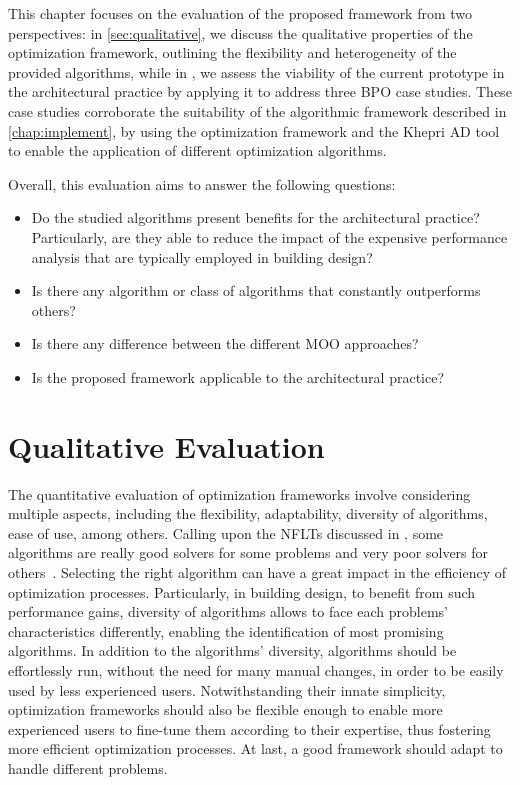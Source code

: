 \label{chap:evaluation}
 
This chapter focuses on the evaluation of the proposed framework from two perspectives: in \cref{sec:qualitative}, we discuss the qualitative properties of the optimization framework, outlining the flexibility and heterogeneity of the provided algorithms, while in , we assess the viability of the current prototype in the architectural practice by applying it to address three \ac{BPO} case studies. These case studies corroborate the suitability of the algorithmic framework described in \cref{chap:implement}, by using the optimization framework and the Khepri \ac{AD} tool to enable the application of different optimization algorithms. 

Overall, this evaluation aims to answer the following questions: 
\begin{itemize}
	\item Do the studied algorithms present benefits for the architectural practice? Particularly, are they able to reduce the impact of the expensive performance analysis that are typically employed in building design?
	\item Is there any algorithm or class of algorithms that constantly outperforms others?
	\item Is there any difference between the different \ac{MOO} approaches? 
	\item Is the proposed framework applicable to the architectural practice? 
\end{itemize}

\section{Qualitative Evaluation}
\label{sec:qualitative}
The quantitative evaluation of optimization frameworks involve considering multiple aspects, including the flexibility, adaptability, diversity of algorithms, ease of use, among others. Calling upon the \acp{NFLT} discussed in , some algorithms are really good solvers for some problems and very poor solvers for others~\cite{Wolpert1997NFLT}. Selecting the right algorithm can have a great impact in the efficiency of optimization processes. Particularly, in building design, to benefit from such performance gains, diversity of algorithms allows to face each problems' characteristics differently, enabling the identification of most promising algorithms. In addition to the algorithms' diversity, algorithms should be effortlessly run, without the need for many manual changes, in order to be easily used by less experienced users. Notwithstanding their innate simplicity, optimization frameworks should also be flexible enough to enable more experienced users to fine-tune them according to their expertise, thus fostering more efficient optimization processes. At last, a good framework should adapt to handle different problems.

